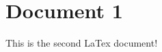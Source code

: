 \documentclass{article}
\begin{document}
\section*{Document 1}
This is the second LaTex document!
\end{document}
